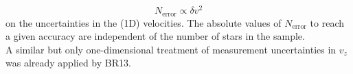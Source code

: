 \begin{equation*}
N_\text{error} \propto \delta v^2
\end{equation*}
on the uncertainties in the (1D) velocities. The absolute values of $N_\text{error}$ to reach a given accuracy are independent of the number of stars in the sample. 
\\A similar but only one-dimensional treatment of measurement uncertainties in $v_z$ was already applied by BR13.

